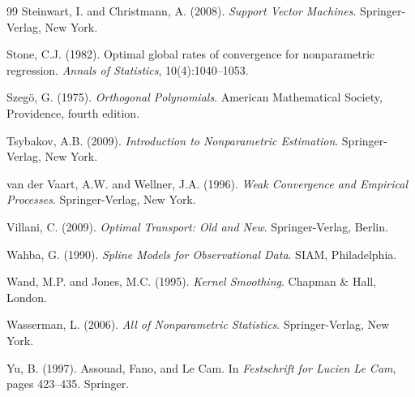 \documentclass[11pt,a4paper]{article}
\begin{document}
\begin{thebibliography}{99}
Steinwart, I. and Christmann, A. (2008).
\newblock \emph{Support Vector Machines}.
\newblock Springer-Verlag, New York.

Stone, C.J. (1982).
\newblock Optimal global rates of convergence for nonparametric regression.
\newblock \emph{Annals of Statistics}, 10(4):1040--1053.

Szeg\"o, G. (1975).
\newblock \emph{Orthogonal Polynomials}.
\newblock American Mathematical Society, Providence, fourth edition.

Tsybakov, A.B. (2009).
\newblock \emph{Introduction to Nonparametric Estimation}.
\newblock Springer-Verlag, New York.

van der Vaart, A.W. and Wellner, J.A. (1996).
\newblock \emph{Weak Convergence and Empirical Processes}.
\newblock Springer-Verlag, New York.

Villani, C. (2009).
\newblock \emph{Optimal Transport: Old and New}.
\newblock Springer-Verlag, Berlin.

Wahba, G. (1990).
\newblock \emph{Spline Models for Observational Data}.
\newblock SIAM, Philadelphia.

Wand, M.P. and Jones, M.C. (1995).
\newblock \emph{Kernel Smoothing}.
\newblock Chapman \& Hall, London.

Wasserman, L. (2006).
\newblock \emph{All of Nonparametric Statistics}.
\newblock Springer-Verlag, New York.

Yu, B. (1997).
\newblock Assouad, Fano, and Le Cam.
\newblock In \emph{Festschrift for Lucien Le Cam}, pages 423--435. Springer.

\end{thebibliography}
\end{document}
